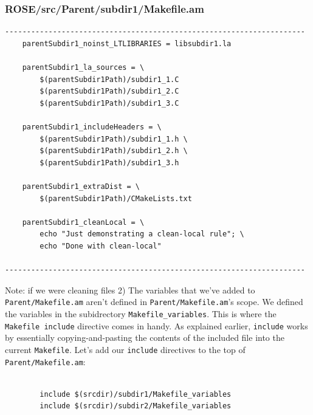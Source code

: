 \subsubsection{ROSE/src/Parent/subdir1/Makefile.am}
    \begin{verbatim}
---------------------------------------------------------------------
    parentSubdir1_noinst_LTLIBRARIES = libsubdir1.la

    parentSubdir1_la_sources = \
        $(parentSubdir1Path)/subdir1_1.C
        $(parentSubdir1Path)/subdir1_2.C
        $(parentSubdir1Path)/subdir1_3.C 

    parentSubdir1_includeHeaders = \
        $(parentSubdir1Path)/subdir1_1.h \
        $(parentSubdir1Path)/subdir1_2.h \
        $(parentSubdir1Path)/subdir1_3.h

    parentSubdir1_extraDist = \
        $(parentSubdir1Path)/CMakeLists.txt

    parentSubdir1_cleanLocal = \
        echo "Just demonstrating a clean-local rule"; \
        echo "Done with clean-local"

---------------------------------------------------------------------
    \end{verbatim}
Note: if we were cleaning files
2) The variables that we've added to \texttt{Parent/Makefile.am} aren't
defined in \texttt{Parent/Makefile.am}'s scope. We defined the variables in the subidrectory
\texttt{Makefile\_variables}. This is where the \texttt{Makefile include} directive
comes in handy. As explained earlier, \texttt{include} works by essentially copying-and-pasting
the contents of the included file into the current \texttt{Makefile}. Let's add our
\texttt{include} directives to the top of \texttt{Parent/Makefile.am}:
    \begin{verbatim}

        include $(srcdir)/subdir1/Makefile_variables
        include $(srcdir)/subdir2/Makefile_variables
    \end{verbatim}












